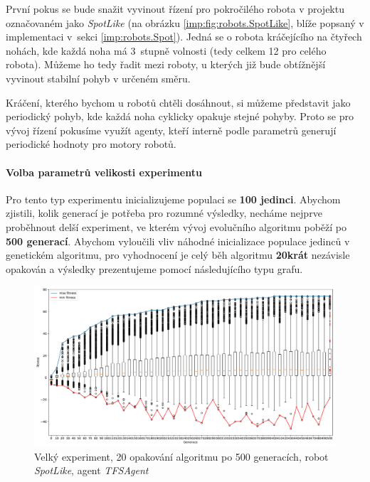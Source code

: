 První pokus se bude snažit vyvinout řízení pro pokročilého robota v projektu
označovaném jako \emph{SpotLike} (na obrázku \ref{imp:fig:robots.SpotLike}, blíže
popsaný v implementaci v~sekci \ref{imp:robots.Spot}). Jedná se o robota
kráčejícího na čtyřech nohách, kde každá noha má 3~stupně volnosti (tedy celkem
12 pro celého robota). Můžeme ho tedy řadit mezi roboty, u kterých již bude
obtížnější vyvinout stabilní pohyb v určeném směru.

Kráčení, kterého bychom u robotů chtěli dosáhnout, si můžeme představit jako
periodický pohyb, kde každá noha cyklicky opakuje stejné pohyby. Proto se pro
vývoj řízení pokusíme využít agenty, kteří interně podle parametrů generují
periodické hodnoty pro motory robotů. 

\paragraph{Volba parametrů velikosti experimentu}
Pro tento typ experimentu inicializujeme populaci se \textbf{100 jedinci}.
Abychom zjistili, kolik generací je potřeba pro rozumné výsledky, necháme
nejprve proběhnout delší experiment, ve kterém vývoj evolučního algoritmu
poběží po \textbf{500 generací}. Abychom vyloučili vliv náhodné inicializace
populace jedinců v genetickém algoritmu, pro vyhodnocení je celý
běh algoritmu \textbf{20krát} nezávisle opakován a výsledky prezentujeme
pomocí následujícího typu grafu.

\begin{figure}[!htb]
    \centering
    \includegraphics[width=1\textwidth]{../img/BIGexperiment1_TFS_10ticks.pdf}
    \caption{Velký experiment, 20 opakování algoritmu po 500 generacích, robot
    \emph{SpotLike}, agent \emph{TFSAgent}}
    \label{fig:exp_big}
\end{figure}

